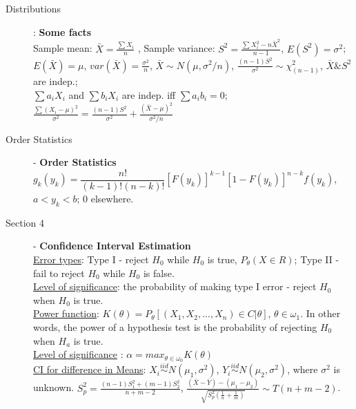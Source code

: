 \documentclass[10pt,landscape]{article}
\begin{document}
\begin{multicols}{3}
    \begin{description}
        \item[Distributions]: \textbf{Some facts }\\
        Sample mean: $\bar{X} = \frac{\sum X_i}{n}$ ,  Sample variance: $S^2 = \frac{\sum X_i^2 - n\bar{X}^2}{n-1}$, $E(S^2) = \sigma^2$; \\
        $E(\bar{X}) = \mu$, $var(\bar{X}) = \frac{\sigma^2}{n}$, $\bar{X} \sim N(\mu, \sigma^2/n)$, $\frac{(n-1)S^2}{\sigma^2} \sim	\chi_{(n-1)}^2$, $\bar{X} \& S^2$ are indep.; \\
        $\sum a_iX_i$ and $\sum b_iX_i$  are indep. iff $\sum a_ib_i = 0$;\\
        $\frac{\sum (X_i - \mu )^2}{\sigma^2} = \frac{(n-1)S^2}{\sigma^2} + \frac{(\bar{X} - \mu)^2}{\sigma^2/n}$\\

         
    \end{description}
 

    
    \begin{description}
    		\item[Order Statistics] - \textbf{Order Statistics}\\ %
    		$g_k(y_k) = \dfrac{n!}{(k-1)!(n-k)!}[F(y_k)]^{k-1}[1-F(y_k)]^{n-k}f(y_k)$, $a< y_k <b$; 0 elsewhere.
		
    		
    \end{description}   
    
    \begin{description}
    		\item[Section 4] - \textbf{Confidence Interval Estimation}\\ %
    		\underline{Error types}: Type I - reject $H_0$ while $H_0$ is true, $P_{\theta}(X\in R)$; Type II - fail to reject $H_0$ while $H_0$ is false. \\
    		\underline{Level of significance}: the probability of making type I error - reject $H_0$ when $H_0$ is true. \\ 
    		\underline{Power function}: $K(\theta) = P_{\theta}[(X_1, X_2, ..., X_n) \in C | \theta]$,  $\theta \in \omega_1$. In other words,  the power of a hypothesis test is the probability of rejecting $H_0$ when $H_a$  is true. \\
    		\underline{Level of significance} : $\alpha =  max_{\theta	\in \omega_0} K(\theta)$ \\
    		\underline{CI for difference in Means}: $X_i \overset{iid} \sim N(\mu_1, \sigma^2)$, $Y_i \overset{iid} \sim N(\mu_2, \sigma^2)$, where $\sigma^2$ is unknown. $S_p^2 = \frac{(n-1)S_1^2 + (m-1)S_2^2}{n+m-2}$, $\frac{(\bar{X} - \bar{Y}) - (\mu_1 - \mu_2)}{\sqrt{S_p^2(\frac{1}{n} + \frac{1}{m})}} \sim T(n+m-2)$. \\
    		

\end{description}
\end{multicols}
\end{document}
